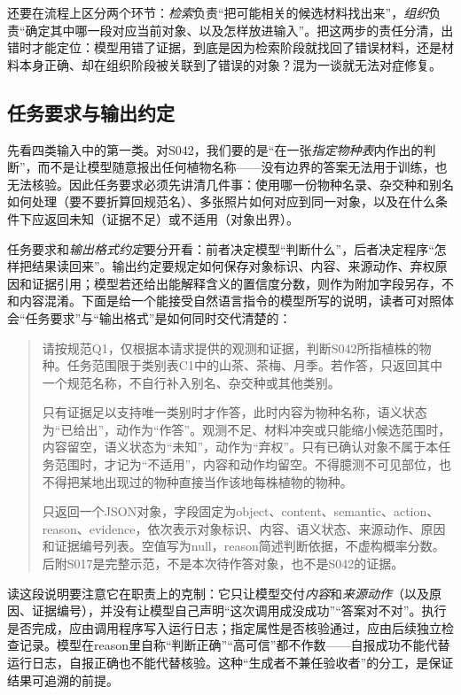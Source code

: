 还要在流程上区分两个环节：\emph{检索}负责“把可能相关的候选材料找出来”，\emph{组织}负责“确定其中哪一段对应当前对象、以及怎样放进输入”。把这两步的责任分清，出错时才能定位：模型用错了证据，到底是因为检索阶段就找回了错误材料，还是材料本身正确、却在组织阶段被关联到了错误的对象？混为一谈就无法对症修复。

\subsection{任务要求与输出约定}
\label{sec:knowledge-acquisition-task-output-contract}

先看四类输入中的第一类。对S042，我们要的是“在一张\emph{指定物种表}内作出的判断”，而不是让模型随意报出任何植物名称——没有边界的答案无法用于训练，也无法核验。因此任务要求必须先讲清几件事：使用哪一份物种名录、杂交种和别名如何处理（要不要折算回规范名）、多张照片如何对应到同一对象，以及在什么条件下应返回未知（证据不足）或不适用（对象出界）。

任务要求和\emph{输出格式约定}要分开看：前者决定模型“判断什么”，后者决定程序“怎样把结果读回来”。输出约定要规定如何保存对象标识、内容、来源动作、弃权原因和证据引用；模型若还给出能解释含义的置信度分数，则作为附加字段另存，不和内容混淆。下面是给一个能接受自然语言指令的模型所写的说明，读者可对照体会“任务要求”与“输出格式”是如何同时交代清楚的：

\begin{quote}
  请按规范Q1，仅根据本请求提供的观测和证据，判断S042所指植株的物种。任务范围限于类别表C1中的山茶、茶梅、月季。若作答，只返回其中一个规范名称，不自行补入别名、杂交种或其他类别。

  只有证据足以支持唯一类别时才作答，此时内容为物种名称，语义状态为“已给出”，动作为“作答”。观测不足、材料冲突或只能缩小候选范围时，内容留空，语义状态为“未知”，动作为“弃权”。只有已确认对象不属于本任务范围时，才记为“不适用”，内容和动作均留空。不得臆测不可见部位，也不得把某地出现过的物种直接当作该地每株植物的物种。

  只返回一个JSON对象，字段固定为object、content、semantic、action、reason、evidence，依次表示对象标识、内容、语义状态、来源动作、原因和证据编号列表。空值写为null，reason简述判断依据，不虚构概率分数。后附S017是完整示范，不是本次待作答对象，也不是S042的证据。
\end{quote}

读这段说明要注意它在职责上的克制：它只让模型交付\emph{内容}和\emph{来源动作}（以及原因、证据编号），并没有让模型自己声明“这次调用成没成功”“答案对不对”。执行是否完成，应由调用程序写入运行日志；指定属性是否核验通过，应由后续独立检查记录。模型在reason里自称“判断正确”“高可信”都不作数——自报成功不能代替运行日志，自报正确也不能代替核验。这种“生成者不兼任验收者”的分工，是保证结果可追溯的前提。

